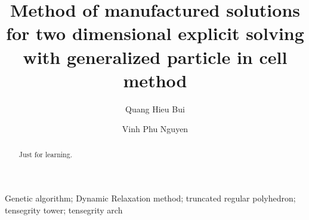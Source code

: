 \documentclass[preprint,3p,12pt]{elsarticle}
\begin{document}
\begin{frontmatter}



\title{\textbf{Method of manufactured solutions for two dimensional explicit solving with generalized particle in cell method}}


\author[1]{Quang Hieu Bui}
\author[2]{Vinh Phu Nguyen}


\address[1]{Faculty of Civil Engineering, The University of Danang-University of Science and Technology, 54 Nguyen Luong Bang, Danang, Vietnam}
\address[2]{Department of Civil Engineering, Monash University, Clayton 3800, VIC, Australia}


\begin{abstract}
Just for learning.

\end{abstract}



\begin{keyword}
Genetic algorithm; Dynamic Relaxation method; truncated regular polyhedron; tensegrity tower; tensegrity arch
\end{keyword}

\end{frontmatter}
\end{document}
